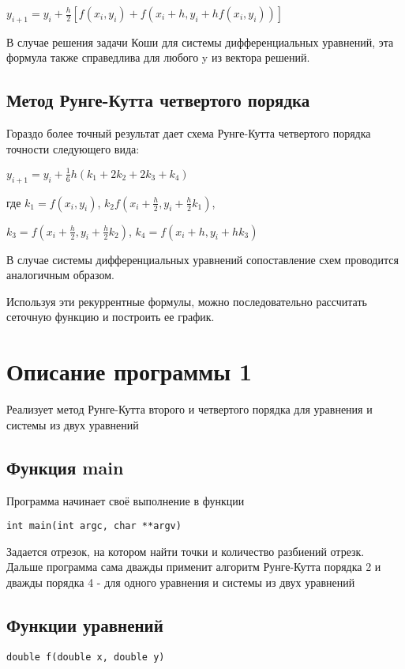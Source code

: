 \documentclass[a4paper,12pt,titlepage,finall]{article}
\begin{document}
$y_{i+1} = y_{i} + \frac{h}{2}[f(x_i,y_i) + f(x_i + h, y_i + hf(x_i,y_i))]$

В случае решения задачи Коши для системы дифференциальных уравнений, эта формула также справедлива для любого y из вектора решений.


\subsection{Метод Рунге-Кутта четвертого порядка}

Гораздо более точный результат дает схема Рунге-Кутта четвертого порядка точности следующего вида:

$y_{i+1} = y_i + \frac{1}{6} h(k_1 + 2k_2 + 2k_3 + k_4)$

где $k_1 = f(x_i, y_i)$, $k_2  f(x_i + \frac{h}{2},y_i + \frac{h}{2} k_1)$, 

$k_3 = f(x_i + \frac{h}{2},y_i + \frac{h}{2} k_2)$, $k_4 = f(x_i + h, y_i + hk_3)$

В случае системы дифференциальных уравнений сопоставление схем проводится аналогичным образом.


Используя эти рекуррентные формулы, можно последовательно рассчитать сеточную функцию и построить ее график.

\newpage
\section{Описание программы 1}

Реализует метод Рунге-Кутта второго и четвертого порядка для уравнения и системы из двух уравнений

\subsection{Функция main}
Программа начинает своё выполнение в функции
\begin{verbatim}
int main(int argc, char **argv)
\end{verbatim}

Задается отрезок, на котором найти точки и количество разбиений отрезк.
Дальше программа сама дважды применит алгоритм Рунге-Кутта порядка 2 и дважды порядка 4 - для одного уравнения и системы из двух уравнений

\subsection{Функции уравнений}

\begin{verbatim}
double f(double x, double y)
\end{verbatim}
\end{document}
